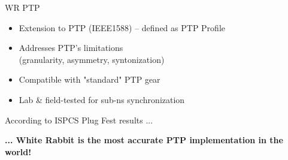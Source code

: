 \documentclass[compress,red]{beamer}
\begin{document}
% 
% 
% 
% 
% 
% 
% 
\begin{frame}{WR PTP}

  \begin{itemize}
    \item Extension to PTP (IEEE1588) -- defined as PTP Profile
    \item Addresses PTP's limitations \\(granularity, asymmetry, syntonization)
    \item Compatible with "standard" PTP gear
    \item Lab \& field-tested for sub-ns synchronization
  \end{itemize}
  \begin{block}{According to ISPCS Plug Fest results ...}
    \begin{center}
      \textbf{... White Rabbit is the most accurate PTP implementation in the world!}
     \end{center}
  \end{block}

\end{frame}
\end{document}
